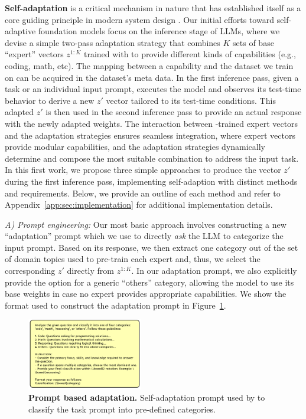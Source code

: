 \textbf{Self-adaptation} is a critical mechanism in nature that has established itself as a core guiding principle in modern system design \citep{7302492}. Our initial efforts toward self-adaptive foundation models focus on the inference stage of LLMs, where we devise a simple two-pass adaptation strategy that combines $K$ sets of base ``expert'' vectors $z^{1:K}$ trained with \svdacro to provide different kinds of capabilities (e.g., coding, math, etc).
The mapping between a capability and the dataset we train on can be acquired in the dataset's meta data.
In the first inference pass, given a task or an individual input prompt, \implname executes the model and observes its test-time behavior to derive a new $z'$ vector tailored to its test-time conditions. 
This adapted $z'$ is then used in the second inference pass to provide an actual response with the newly adapted weights.
The interaction between \svdacro-trained expert vectors and the adaptation strategies ensures seamless integration, where expert vectors provide modular capabilities, and the adaptation strategies dynamically determine and compose the most suitable combination to address the input task.
In this first work, we propose three simple approaches to produce the vector $z'$ during the first inference pass, implementing self-adaption with distinct methods and requirements. Below, we provide an outline of each method and refer to Appendix~\ref{app:sec:implementation} for additional implementation details.


\textit{A) Prompt engineering:}
Our most basic approach involves constructing a new ``adaptation'' prompt which we use to directly \textit{ask} the LLM to categorize the input prompt.
Based on its response, we then extract one category out of the set of domain topics used to pre-train each \svdacro expert and, thus, we select the corresponding $z'$ directly from $z^{1:K}$.
In our adaptation prompt, we also explicitly provide the option for a generic ``others'' category, allowing the model to use its base weights in case no expert provides appropriate capabilities. We show the format used to construct the adaptation prompt in Figure~\ref{fig:sys_prompt}.

\begin{figure}
\vspace{-8mm}
\begin{center}
    \includegraphics[width=0.45\textwidth]{images/visualization/system_prompt.pdf}
  \end{center}
  \vspace{-5.5mm} 
  \caption{\textbf{Prompt based adaptation.} Self-adaptation prompt used by \implname to classify the task prompt into pre-defined categories.}
  \label{fig:sys_prompt}
  \vspace{-4mm}
\end{figure}


